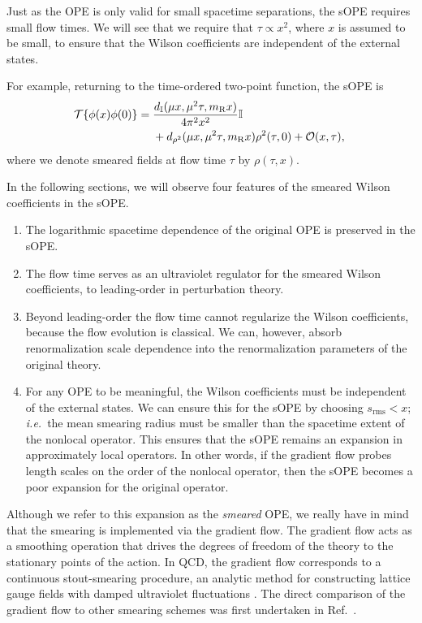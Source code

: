 Just as the OPE is only valid 
for small spacetime separations, the sOPE requires small flow times. We will 
see that we require that $\tau \propto x^2$, where $x$ is assumed to be small, 
to ensure that the Wilson coefficients are independent of the external states.

For example, returning to the time-ordered two-point 
function, the sOPE is
\begin{align}\label{eq:sope2pt}
\!\!{\cal T}\{\phi(x)\phi(0)\} ={} &
\frac{d_{\mathbb{I}}(\mu x,\mu^2\tau,m_{\mathrm{R}}x)}{4\pi^2x^2}\mathbb{I}
\nonumber\\
{} & + 
d_{\rho^2}(\mu x,\mu^2\tau,m_{\mathrm{R}}x)\rho^2(\tau,0)  + 
{\cal O}(x,\tau),
\end{align}
where we denote smeared fields at flow time $\tau$ by $\rho(\tau,x)$.

In the following sections, we will observe four features of the 
smeared Wilson coefficients in the sOPE.
\begin{enumerate}
\item The logarithmic spacetime dependence of the original OPE is preserved in 
the sOPE.
\item The flow time serves as an ultraviolet regulator for the smeared Wilson 
coefficients, to leading-order in perturbation theory. 
\item Beyond leading-order the flow time cannot regularize the Wilson 
coefficients, because the flow evolution is classical. We can, however, absorb 
renormalization scale dependence into the renormalization parameters 
of the original theory.
\item For any OPE to be meaningful, the Wilson coefficients must be independent 
of the external states. We can ensure this for the sOPE by choosing 
$s_{\mathrm{rms}} < x$; \emph{i.e.}~the mean smearing radius must be smaller 
than the spacetime extent of the nonlocal operator. This ensures that the sOPE
remains an expansion in approximately local operators. In other words, if the 
gradient flow probes length scales on the order of the nonlocal operator, then 
the sOPE becomes a poor expansion for the original operator.
\end{enumerate}

Although we refer to this expansion as the \emph{smeared} OPE, we really have 
in mind that the smearing is implemented via the gradient flow. The 
gradient flow acts as a smoothing operation that
drives the degrees of freedom of the theory to the stationary points of the 
action. In
QCD, the gradient flow corresponds to a continuous stout-smearing procedure, an 
analytic method for constructing lattice gauge fields with damped ultraviolet
fluctuations \cite{Morningstar:2003gk}. The direct comparison of the gradient 
flow to other smearing schemes was first undertaken in 
Ref.~\cite{Bonati:2014tqa}.

